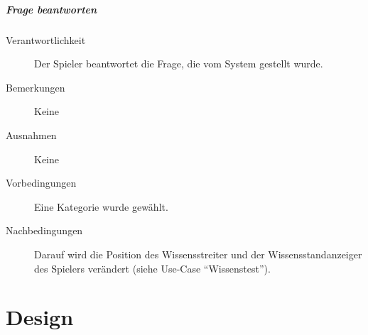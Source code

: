 \documentclass{report}
\begin{document}
\paragraph{Frage beantworten}
\begin{description}
	\item[Verantwortlichkeit] Der Spieler beantwortet die Frage, die vom System gestellt wurde.
	\item[Bemerkungen] Keine
	\item[Ausnahmen] Keine
	\item[Vorbedingungen] Eine Kategorie wurde gewählt.
	\item[Nachbedingungen] Darauf wird die Position des Wissensstreiter und der Wissensstandanzeiger des Spielers verändert (siehe Use-Case "`Wissenstest"').
\end{description}

\chapter{Design}
\end{document}
